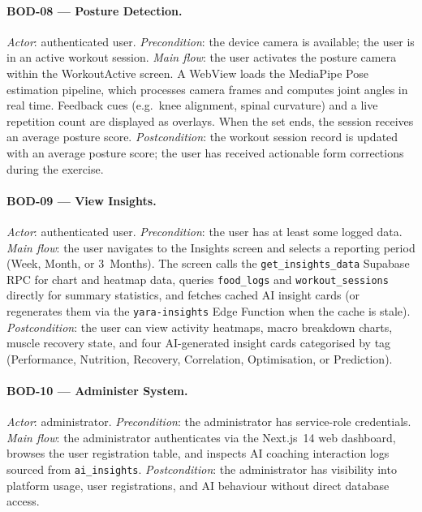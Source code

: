 \paragraph{BOD-08 — Posture Detection.}
\textit{Actor}: authenticated user.
\textit{Precondition}: the device camera is available; the user is in an
active workout session.
\textit{Main flow}: the user activates the posture camera within the
WorkoutActive screen. A WebView loads the MediaPipe Pose estimation
pipeline, which processes camera frames and computes joint angles in real
time. Feedback cues (e.g.\ knee alignment, spinal curvature) and a live
repetition count are displayed as overlays. When the set ends, the session
receives an average posture score.
\textit{Postcondition}: the workout session record is updated with an
average posture score; the user has received actionable form corrections
during the exercise.

\paragraph{BOD-09 — View Insights.}
\textit{Actor}: authenticated user.
\textit{Precondition}: the user has at least some logged data.
\textit{Main flow}: the user navigates to the Insights screen and selects
a reporting period (Week, Month, or 3~Months). The screen calls the
\texttt{get\_insights\_data} Supabase RPC for chart and heatmap data,
queries \texttt{food\_logs} and \texttt{workout\_sessions} directly for
summary statistics, and fetches cached AI insight cards (or regenerates
them via the \texttt{yara-insights} Edge Function when the cache is stale).
\textit{Postcondition}: the user can view activity heatmaps, macro
breakdown charts, muscle recovery state, and four AI-generated insight
cards categorised by tag (Performance, Nutrition, Recovery, Correlation,
Optimisation, or Prediction).

\paragraph{BOD-10 — Administer System.}
\textit{Actor}: administrator.
\textit{Precondition}: the administrator has service-role credentials.
\textit{Main flow}: the administrator authenticates via the Next.js~14
web dashboard, browses the user registration table, and inspects AI
coaching interaction logs sourced from \texttt{ai\_insights}.
\textit{Postcondition}: the administrator has visibility into platform
usage, user registrations, and AI behaviour without direct database access.

